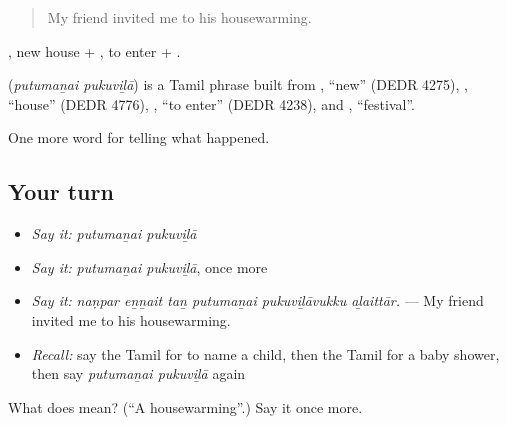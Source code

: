 \begin{quote}
My friend invited me to his housewarming.
\end{quote}

 , new house + , to enter + .

\begin{cousinweb}
\textbf{ } (\emph{putumaṉai pukuviḻā}) is a Tamil phrase built from , \textquotedblleft{}new\textquotedblright{} (DEDR 4275), , \textquotedblleft{}house\textquotedblright{} (DEDR 4776), , \textquotedblleft{}to enter\textquotedblright{} (DEDR 4238), and , \textquotedblleft{}festival\textquotedblright{}.
\end{cousinweb}

\begin{grammarlens}[title={What you've built}]
One more word for telling what happened.
\end{grammarlens}

\subsection*{Your turn}
\begin{itemize}
\raggedright
  \item \emph{Say it:} \emph{putumaṉai pukuviḻā}
  \item \emph{Say it:} \emph{putumaṉai pukuviḻā}, once more
  \item \emph{Say it:} \emph{naṇpar eṉṉait taṉ putumaṉai pukuviḻāvukku aḻaittār.} — My friend invited me to his housewarming.
  \item \emph{Recall:} say the Tamil for to name a child, then the Tamil for a baby shower, then say \emph{putumaṉai pukuviḻā} again
\end{itemize}

\begin{tcolorbox}[breakable,colback=teal!4,colframe=teal!35!black,title={Before you move on}]
What does   mean? (\textquotedblleft{}A housewarming\textquotedblright{}.) Say it once more.
\end{tcolorbox}
